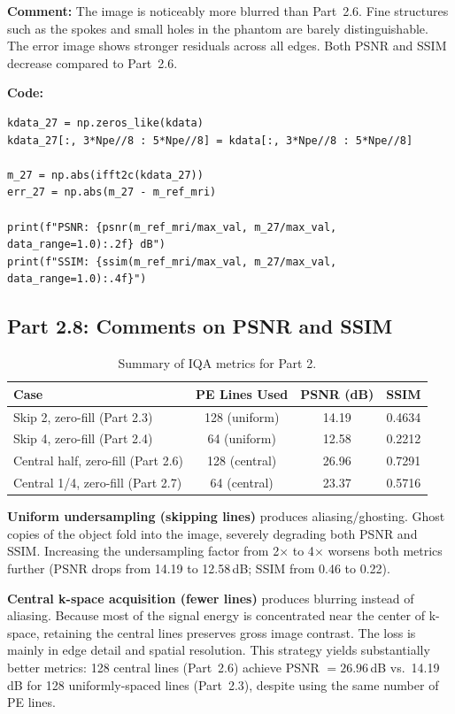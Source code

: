 \documentclass[12pt]{article}
\begin{document}
\textbf{Comment:} The image is noticeably more blurred than Part~2.6. Fine structures such as the spokes and small holes in the phantom are barely distinguishable. The error image shows stronger residuals across all edges. Both PSNR and SSIM decrease compared to Part~2.6.

\textbf{Code:}
\begin{lstlisting}
kdata_27 = np.zeros_like(kdata)
kdata_27[:, 3*Npe//8 : 5*Npe//8] = kdata[:, 3*Npe//8 : 5*Npe//8]

m_27 = np.abs(ifft2c(kdata_27))
err_27 = np.abs(m_27 - m_ref_mri)

print(f"PSNR: {psnr(m_ref_mri/max_val, m_27/max_val, data_range=1.0):.2f} dB")
print(f"SSIM: {ssim(m_ref_mri/max_val, m_27/max_val, data_range=1.0):.4f}")
\end{lstlisting}

\subsection{Part 2.8: Comments on PSNR and SSIM}

\begin{table}[H]
\centering
\begin{tabular}{|l|c|c|c|}
\hline
\textbf{Case} & \textbf{PE Lines Used} & \textbf{PSNR (dB)} & \textbf{SSIM} \\
\hline
Skip 2, zero-fill (Part 2.3) & 128 (uniform) & 14.19 & 0.4634 \\
Skip 4, zero-fill (Part 2.4) & 64 (uniform) & 12.58 & 0.2212 \\
Central half, zero-fill (Part 2.6) & 128 (central) & 26.96 & 0.7291 \\
Central 1/4, zero-fill (Part 2.7) & 64 (central) & 23.37 & 0.5716 \\
\hline
\end{tabular}
\caption{Summary of IQA metrics for Part 2.}
\label{tab:p2_iqa}
\end{table}

\textbf{Uniform undersampling (skipping lines)} produces aliasing/ghosting. Ghost copies of the object fold into the image, severely degrading both PSNR and SSIM. Increasing the undersampling factor from 2$\times$ to 4$\times$ worsens both metrics further (PSNR drops from 14.19 to 12.58\,dB; SSIM from 0.46 to 0.22).

\textbf{Central k-space acquisition (fewer lines)} produces blurring instead of aliasing. Because most of the signal energy is concentrated near the center of k-space, retaining the central lines preserves gross image contrast. The loss is mainly in edge detail and spatial resolution. This strategy yields substantially better metrics: 128 central lines (Part~2.6) achieve PSNR $= 26.96$\,dB vs.\ 14.19\,dB for 128 uniformly-spaced lines (Part~2.3), despite using the same number of PE lines.
\end{document}
